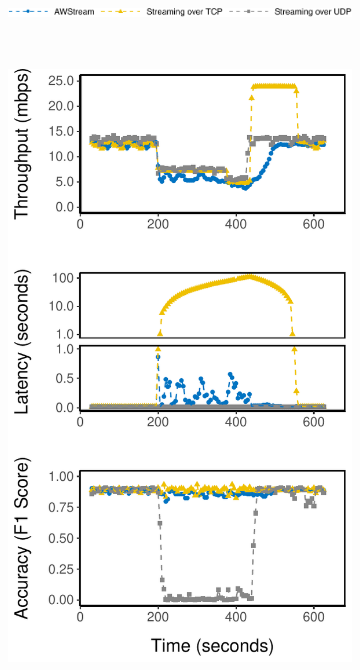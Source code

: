 \begin{figure}
  \begin{subfigure}{\linewidth}
    \centering
    \includegraphics[width=0.5\columnwidth]{figures/runtime-legend.pdf}
  \end{subfigure}
  \\
  \vspace{0.4em}
  \begin{subfigure}{0.3\textwidth}
    \centering
    \includegraphics[width=\textwidth]{figures/runtime-mot-verticle.pdf}

\end{subfigure}
\end{figure}
